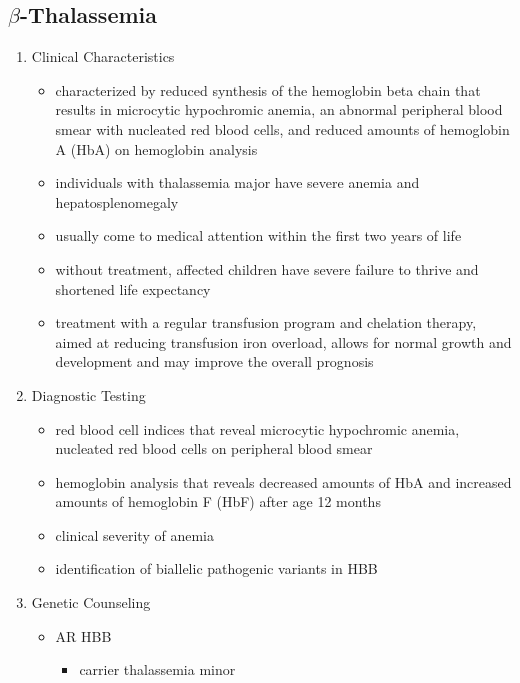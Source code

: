\documentclass[12pt]{scrartcl}
\begin{document}
\subsection{\(\beta\)-Thalassemia}
\label{sec:org93bd6c5}
\begin{enumerate}
\item Clinical Characteristics
\label{sec:org2929834}
\begin{itemize}
\item characterized by reduced synthesis of the hemoglobin beta chain that
results in microcytic hypochromic anemia, an abnormal peripheral
blood smear with nucleated red blood cells, and reduced amounts of
hemoglobin A (HbA) on hemoglobin analysis
\item individuals with thalassemia major have severe anemia and
hepatosplenomegaly
\item usually come to medical attention within the first two years of
life
\item without treatment, affected children have severe failure to thrive
and shortened life expectancy
\item treatment with a regular transfusion program and chelation therapy,
aimed at reducing transfusion iron overload, allows for normal
growth and development and may improve the overall prognosis
\end{itemize}
\item Diagnostic Testing
\label{sec:org2f30118}
\begin{itemize}
\item red blood cell indices that reveal microcytic hypochromic anemia,
nucleated red blood cells on peripheral blood smear
\item hemoglobin analysis that reveals decreased amounts of HbA and
increased amounts of hemoglobin F (HbF) after age 12 months
\item clinical severity of anemia
\item identification of biallelic pathogenic variants in HBB
\end{itemize}
\item Genetic Counseling
\label{sec:org4b6c59c}
\begin{itemize}
\item AR HBB
\begin{itemize}
\item carrier thalassemia minor
\end{itemize}
\end{itemize}
\end{enumerate}
\end{document}
